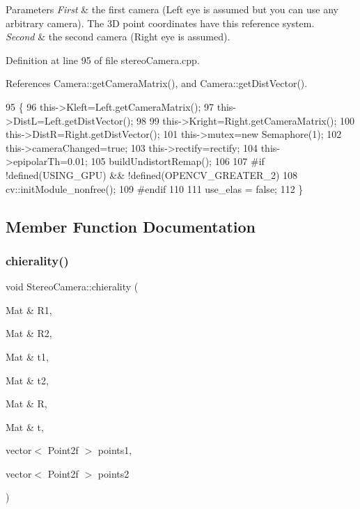 \begin{DoxyParams}{Parameters}
{\em First} & the first camera (Left eye is assumed but you can use any arbitrary camera). The 3D point coordinates have this reference system. \\
\hline
{\em Second} & the second camera (Right eye is assumed). \\
\hline
\end{DoxyParams}


Definition at line 95 of file stereo\+Camera.\+cpp.



References Camera\+::get\+Camera\+Matrix(), and Camera\+::get\+Dist\+Vector().


\begin{DoxyCode}
95                                                                  \{
96     this->Kleft=Left.getCameraMatrix();
97     this->DistL=Left.getDistVector();
98 
99     this->Kright=Right.getCameraMatrix();
100     this->DistR=Right.getDistVector();
101     this->mutex=\textcolor{keyword}{new} Semaphore(1);
102     this->cameraChanged=\textcolor{keyword}{true};
103     this->rectify=rectify;
104     this->epipolarTh=0.01;
105     buildUndistortRemap();
106 
107 \textcolor{preprocessor}{#if !defined(USING\_GPU) && !defined(OPENCV\_GREATER\_2)}
108     cv::initModule\_nonfree();
109 \textcolor{preprocessor}{#endif }
110 
111     use\_elas = \textcolor{keyword}{false};
112 \}
\end{DoxyCode}


\subsection{Member Function Documentation}
\mbox{\label{classStereoCamera_aefb25fc2ecd8d0ce484e5981769dd635}} 
\subsubsection{\texorpdfstring{chierality()}{chierality()}}
{\footnotesize\ttfamily void Stereo\+Camera\+::chierality (\begin{DoxyParamCaption}\item[{Mat \&}]{R1,  }\item[{Mat \&}]{R2,  }\item[{Mat \&}]{t1,  }\item[{Mat \&}]{t2,  }\item[{Mat \&}]{R,  }\item[{Mat \&}]{t,  }\item[{vector$<$ Point2f $>$}]{points1,  }\item[{vector$<$ Point2f $>$}]{points2 }\end{DoxyParamCaption})}



